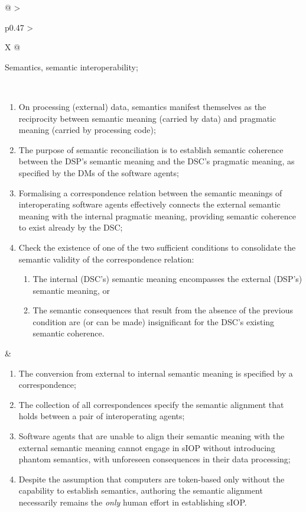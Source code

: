 \begin{xltabular}[l]{\linewidth}{@{} >{\small\raggedright\arraybackslash}p{0.47\linewidth} >{\small\raggedright\arraybackslash}X @{}}
\begin{description}[labelwidth=3.7cm,leftmargin=3.7cm+1ex,nosep,topsep=2ex,labelsep=1ex,font=\bfseries]
  \item[Quality attributes:] Semantics, semantic interoperability;
\end{description}\\
\begin{enumerate}[left=6pt, nosep]
  \item On processing (external) data, semantics manifest themselves as the reciprocity between semantic meaning (carried by data) and pragmatic meaning (carried by processing code);
  \item The purpose of semantic reconciliation is to establish semantic coherence between the DSP's semantic meaning and the DSC's pragmatic meaning, as specified by the DMs of the software agents;
  \item Formalising a correspondence relation between the semantic meanings of interoperating software agents effectively connects the external semantic meaning with the internal pragmatic meaning, providing semantic coherence to exist already by the DSC;
  \item Check the existence of one of the two sufficient conditions to consolidate the semantic validity of the correspondence relation: 
  \begin{enumerate}
    \item The internal (DSC's) semantic meaning encompasses the external (DSP's) semantic meaning, or
    \item The semantic consequences that result from the absence of the previous condition are (or can be made) insignificant for the DSC's existing semantic coherence.
  \end{enumerate}
\end{enumerate}
&
\begin{enumerate}[left=10pt, nosep]
  \item The conversion from external to internal semantic meaning is specified by a correspondence;
  \item The collection of all correspondences specify the semantic alignment that holds between a pair of interoperating agents;
  \item Software agents that are unable to align their semantic meaning with the external semantic meaning cannot engage in sIOP without introducing phantom semantics, with unforeseen consequences in their data processing;
  \item Despite the assumption that computers are token-based only without the capability to establish semantics, authoring the semantic alignment necessarily remains the \emph{only} human effort in establishing sIOP.

\end{enumerate}
\end{xltabular}
